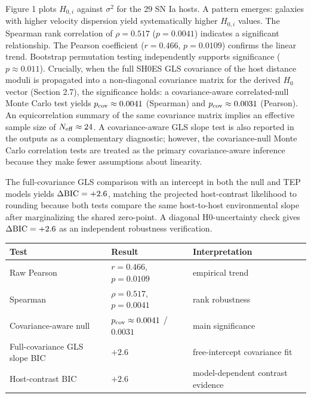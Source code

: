 \documentclass[
]{article}
\newcounter{none} %
\begin{document}
Figure 1 plots \(H_{0,i}\) against \(\sigma^2\) for the 29 SN Ia hosts.
A pattern emerges: galaxies with higher velocity dispersion yield
systematically higher \(H_{0,i}\) values. The Spearman rank correlation
of \(\rho = 0.517\) (\(p =
0.0041\)) indicates a significant relationship. The Pearson coefficient
(\(r =
0.466\), \(p = 0.0109\)) confirms the linear trend. Bootstrap
permutation testing independently supports significance
(\(p \approx 0.011\)). Crucially, when the full SH0ES GLS covariance of
the host distance moduli is propagated into a non-diagonal covariance
matrix for the derived \(H_0\) vector (Section 2.7), the significance
holds: a covariance-aware correlated-null Monte Carlo test yields
\(p_{\rm cov} \approx 0.0041\) (Spearman) and \(p_{\rm cov} \approx
0.0031\) (Pearson). An equicorrelation summary of the same covariance
matrix implies an effective sample size of \(N_{\rm eff} \approx 24\). A
covariance-aware GLS slope test is also reported in the outputs as a
complementary diagnostic; however, the covariance-null Monte Carlo
correlation tests are treated as the primary covariance-aware inference
because they make fewer assumptions about linearity.

The full-covariance GLS comparison with an intercept in both the null
and TEP models yields \(\Delta{\rm BIC} = +2.6\), matching the projected
host-contrast likelihood to rounding because both tests compare the same
host-to-host environmental slope after marginalizing the shared
zero-point. A diagonal H\(0\)-uncertainty check gives
\(\Delta{\rm BIC}=+2.6\) as an independent robustness verification.

{\def\LTcaptype{none} %
\begin{longtable}[]{@{}
  >{\raggedright\arraybackslash}p{}
  >{\raggedright\arraybackslash}p{}
  >{\raggedright\arraybackslash}p{}@{}}
\toprule\noalign{}
\begin{minipage}[b]{\linewidth}\raggedright
Test
\end{minipage} & \begin{minipage}[b]{\linewidth}\raggedright
Result
\end{minipage} & \begin{minipage}[b]{\linewidth}\raggedright
Interpretation
\end{minipage} \\
\midrule\noalign{}
\endhead
\bottomrule\noalign{}
\endlastfoot
Raw Pearson & \(r = 0.466\), \(p = 0.0109\) & empirical trend \\
Spearman & \(\rho = 0.517\), \(p = 0.0041\) & rank robustness \\
Covariance-aware null & \(p_{\rm cov} \approx 0.0041\) / \(0.0031\) &
main significance \\
Full-covariance GLS slope BIC & \(+2.6\) & free-intercept covariance
fit \\
Host-contrast BIC & \(+2.6\) & model-dependent contrast evidence \\
\end{longtable}
}
\end{document}
